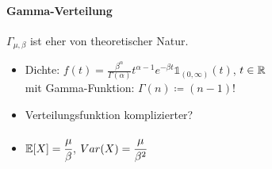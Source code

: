 \newpage
\paragraph{Gamma-Verteilung}
$\Gamma_{\mu,\beta}$ ist eher von theoretischer Natur.
\begin{itemize}
	\item Dichte: $f(t)=\frac{\beta^\alpha}{\Gamma(\alpha)}t^{\alpha-1}e^{-\beta t}\mathds{1}_{(0,\infty)}(t)$, \qquad$t\in\mathbb{R}$\\
	 mit Gamma-Funktion: $\Gamma(n)\coloneqq (n-1)!$
	\item Verteilungsfunktion komplizierter?
	\item $\mathbb{E}[X]=\cfrac{\mu}{\beta}$, $Var(X)=\cfrac{\mu}{\beta^2}$
\end{itemize}